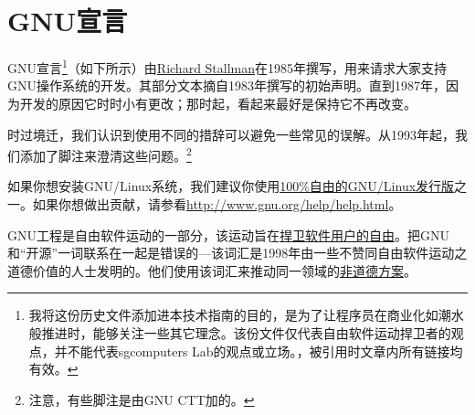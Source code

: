 \chapter{GNU宣言}
GNU宣言\footnote{我将这份历史文件添加进本技术指南的目的，是为了让程序员在商业化如潮水般推进时，能够关注一些其它理念。该份文件仅代表自由软件运动捍卫者的观点，并不能代表sgcomputers Lab的观点或立场。\cite{gnum}，被引用时文章内所有链接均有效。}（如下所示）由\href{http://www.stallman.org/}{Richard Stallman}在1985年撰写，用来请求大家支持GNU操作系统的开发。其部分文本摘自1983年撰写的初始声明。直到1987年，因为开发的原因它时时小有更改；那时起，看起来最好是保持它不再改变。\par
时过境迁，我们认识到使用不同的措辞可以避免一些常见的误解。从1993年起，我们添加了脚注来澄清这些问题。\footnote{注意，有些脚注是由GNU CTT加的。}\par
如果你想安装GNU/Linux系统，我们建议你使用\href{http://www.gnu.org/distros}{100\%自由的GNU/Linux发行版}之一。如果你想做出贡献，请参看\url{http://www.gnu.org/help/help.html}。\par
GNU工程是自由软件运动的一部分，该运动旨在\href{http://www.gnu.org/philosophy/free-sw.html}{捍卫软件用户的自由}。把GNU和“开源”一词联系在一起是错误的—该词汇是1998年由一些不赞同自由软件运动之道德价值的人士发明的。他们使用该词汇来推动同一领域的\href{http://www.gnu.org/philosophy/open-source-misses-the-point.html}{非道德方案}。\par
